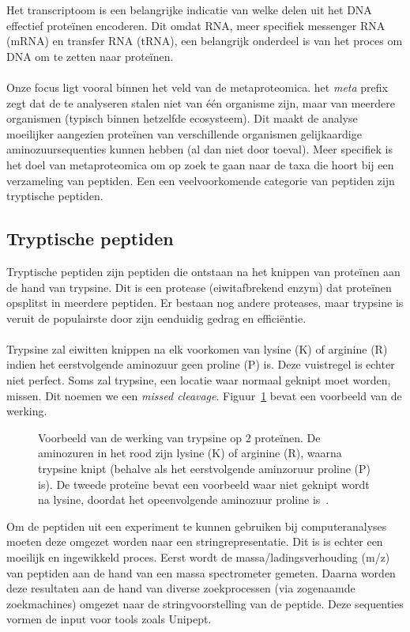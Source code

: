 Het transcriptoom is een belangrijke indicatie van welke delen uit het DNA effectief proteïnen encoderen.
Dit omdat RNA, meer specifiek messenger RNA (mRNA) en transfer RNA (tRNA), een belangrijk onderdeel is van het proces om DNA om te zetten naar proteïnen.
\\ \\
Onze focus ligt vooral binnen het veld van de metaproteomica.
het \textit{meta} prefix zegt dat de te analyseren stalen niet van één organisme zijn, maar van meerdere organismen (typisch binnen hetzelfde ecosysteem).
Dit maakt de analyse moeilijker aangezien proteïnen van verschillende organismen gelijkaardige aminozuursequenties kunnen hebben (al dan niet door toeval).
Meer specifiek is het doel van metaproteomica om op zoek te gaan naar de taxa die hoort bij een verzameling van peptiden.
Een een veelvoorkomende categorie van peptiden zijn tryptische peptiden.

\subsection{Tryptische peptiden}\label{subsec:tryptische-peptiden}
Tryptische peptiden zijn peptiden die ontstaan na het knippen van proteïnen aan de hand van trypsine.
Dit is een protease (eiwitafbrekend enzym) dat proteïnen opsplitst in meerdere peptiden.
Er bestaan nog andere proteases, maar trypsine is veruit de populairste door zijn eenduidig gedrag en efficiëntie.
\\ \\
Trypsine zal eiwitten knippen na elk voorkomen van lysine (K) of arginine (R) indien het eerstvolgende aminozuur geen proline (P) is.
Deze vuistregel is echter niet perfect.
Soms zal trypsine, een locatie waar normaal geknipt moet worden, missen.
Dit noemen we een \textit{missed cleavage}.
Figuur~\ref{fig:trypsine} bevat een voorbeeld van de werking.

\begin{figure}[H]
    \centering
    
    \caption{Voorbeeld van de werking van trypsine op 2 proteïnen. De aminozuren in het rood zijn lysine (K) of arginine (R), waarna trypsine knipt (behalve als het eerstvolgende aminzoruur proline (P) is). De tweede proteïne bevat een voorbeeld waar niet geknipt wordt na lysine, doordat het opeenvolgende aminozuur proline is~\cite{phdPieterUnipept}.}
    \label{fig:trypsine}
\end{figure}

Om de peptiden uit een experiment te kunnen gebruiken bij computeranalyses moeten deze omgezet worden naar een stringrepresentatie.
Dit is is echter een moeilijk en ingewikkeld proces.
Eerst wordt de massa/ladingsverhouding (m/z) van peptiden aan de hand van een massa spectrometer gemeten.
Daarna worden deze resultaten aan de hand van diverse zoekprocessen (via zogenaamde zoekmachines) omgezet naar de stringvoorstelling van de peptide.
Deze sequenties vormen de input voor tools zoals Unipept.

